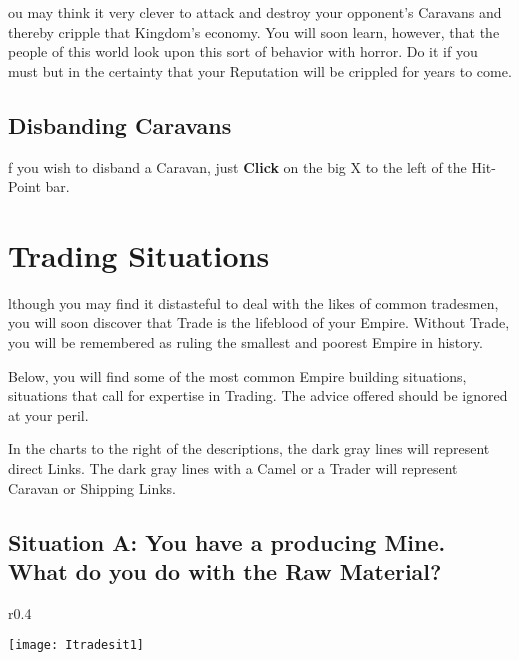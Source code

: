 
ou may think it very clever to attack and destroy your opponent’s Caravans and thereby cripple that Kingdom's economy. You will soon learn, however, that the people of this world look upon this sort of behavior with horror. Do it if you must but in the certainty that your Reputation will be crippled for years to come.

\subsection{\textsf{Disbanding Caravans}}


f you wish to disband a Caravan, just \textbf{Click} on the big X to the left of the Hit-Point bar.

\section{\textsf{Trading Situations}}


lthough you may find it distasteful to deal with the likes of common tradesmen, you will soon discover that Trade is the lifeblood of your Empire. Without Trade, you will be remembered as ruling the smallest and poorest Empire in history.

Below, you will find some of the most common Empire building situations, situations that call for expertise in Trading. The advice offered should be ignored at your peril.

In the charts to the right of the descriptions, the dark gray lines will represent direct Links. The dark gray lines with a Camel or a Trader will represent Caravan or Shipping Links.

\subsection{\textsf{Situation A: You have a producing Mine. What do you do with the Raw Material?}}

\begin{wrapfigure}{r}{0.4\textwidth}
    \vspace{-20pt}
    \begin{center}
        \texttt{[image: Itradesit1]} %
    \end{center}
    \vspace{-20pt}
\end{wrapfigure}

